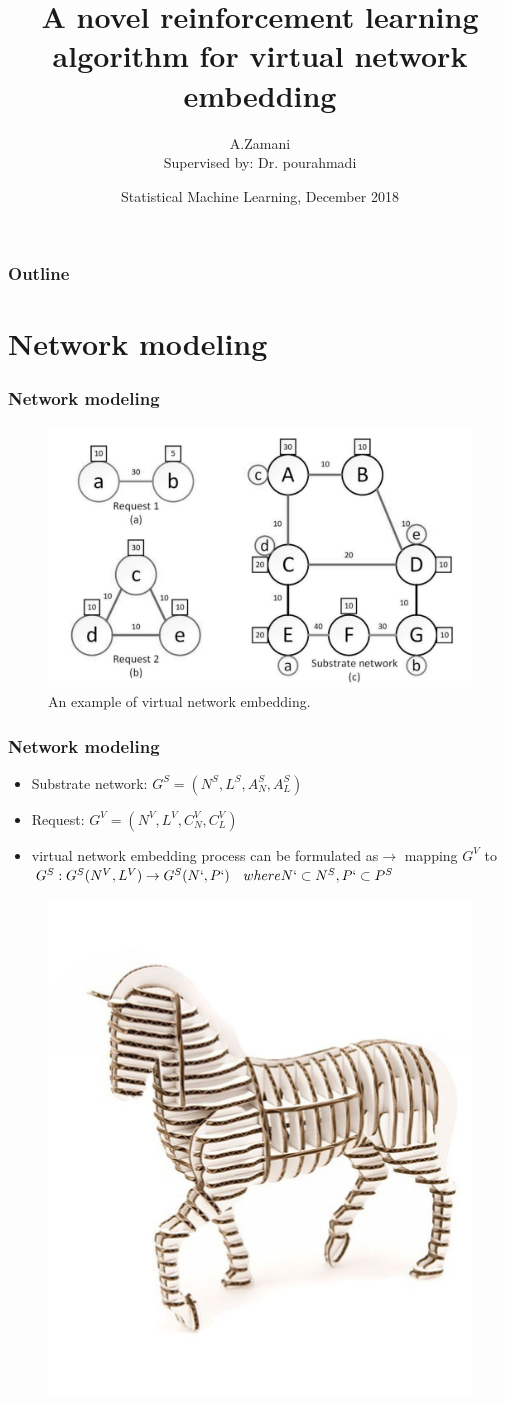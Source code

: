 \documentclass{beamer}
\title[virtual network	embedding]{A novel reinforcement learning algorithm for virtual network	embedding} %
\author[A.Zamani]{A.Zamani\\[1mm]{\small Supervised by: Dr.  pourahmadi}} %
\institute[AUT] %
{
Amirkabir University of Technology \\ %
}
\date[ML, December 2018]{Statistical Machine Learning, December 2018} %
\begin{document}
\begin{frame}
\titlepage %
\end{frame}

\begin{frame}
\frametitle{Outline}
\tableofcontents 
\end{frame}
\section{Network modeling}
\begin{frame}
	\frametitle{Network modeling}
	\begin{figure}
		\centering
		\includegraphics[width=0.7\linewidth]{../Images/Network}
		\caption{An example of virtual network embedding.}
		\label{fig:network}
	\end{figure}
\end{frame}

\begin{frame}
	\frametitle{Network modeling}
	\begin{itemize}
		\item {Substrate network: $G^S=(N^S,L^S,A_N^S,A_L^S)$}
		\item {Request: $G^V=(N^V,L^V,C_N^V,C_L^V)$}
		\item {virtual network embedding process can be formulated as$\to$ mapping $G^V$ to $G^S:G^S(N^V,L^V) \to G^S(N`,P`)\quad where N`\subset
		N^S,P`\subset P^S$}
	\end{itemize}
\begin{figure}
	\centering
	\includegraphics[width=0.4\linewidth]{../Images/modeling}
	\caption{}
	\label{fig:modeling}
\end{figure}
	
\end{frame}
\end{document}
